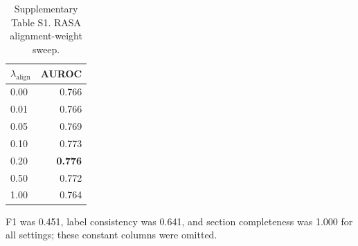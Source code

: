 \begin{table}[!htbp]
  \centering
  \caption{Supplementary Table S1. RASA alignment-weight sweep.}
  \label{tab:s1_rasa_lambda_align_sweep}
  \small
  \begin{threeparttable}
  \begin{tabular}{lr}
    \toprule
    \textbf{$\lambda_{\mathrm{align}}$} & \textbf{AUROC} \\
    \midrule
    0.00 & 0.766 \\
    0.01 & 0.766 \\
    0.05 & 0.769 \\
    0.10 & 0.773 \\
    0.20 & \textbf{0.776} \\
    0.50 & 0.772 \\
    1.00 & 0.764 \\
    \bottomrule
  \end{tabular}
  \begin{tablenotes}[flushleft]
    \footnotesize
    \item F1 was 0.451, label consistency was 0.641, and section completeness was 1.000 for all settings; these constant columns were omitted.
  \end{tablenotes}
  \end{threeparttable}
\end{table}

